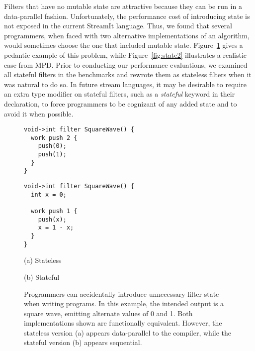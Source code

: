   Filters that have no mutable state are
  attractive because they can be run in a data-parallel fashion.
  Unfortunately, the performance cost of introducing state is not
  exposed in the current StreamIt language.  Thus, we found that
  several programmers, when faced with two alternative implementations
  of an algorithm, would sometimes choose the one that included
  mutable state.  Figure~\ref{fig:state} gives a pedantic example of
  this problem, while Figure~\ref{fig:state2} illustrates a realistic
  case from MPD.  Prior to conducting our performance evaluations, we
  examined all stateful filters in the benchmarks and rewrote them as
  stateless filters when it was natural to do so.  In future stream
  languages, it may be desirable to require an extra type modifier on
  stateful filters, such as a {\it stateful} keyword in their
  declaration, to force programmers to be cognizant of any added state
  and to avoid it when possible.

\begin{figure}[t]
\hspace{0.1\textwidth}
\begin{minipage}{0.35\textwidth}
\centering
\ninepoint
\begin{verbatim}
void->int filter SquareWave() {
  work push 2 {
    push(0);
    push(1);
  }
}
\end{verbatim}
\end{minipage}
\hspace{0.1\textwidth}
\begin{minipage}{0.35\textwidth}
\centering
\ninepoint
\begin{verbatim}
void->int filter SquareWave() {
  int x = 0;
 
  work push 1 {
    push(x);
    x = 1 - x;
  }
}
\end{verbatim}
\end{minipage}

\begin{minipage}{0.5\textwidth}
\centering
(a) Stateless
\end{minipage}
\begin{minipage}{0.5\textwidth}
\centering
(b) Stateful
\end{minipage}
\caption[Accidental introduction of filter state (pedantic example)]{Programmers 
  can accidentally introduce unnecessary filter state when writing
  programs.  In this example, the intended output is a square wave,
  emitting alternate values of 0 and 1.  Both implementations shown
  are functionally equivalent.  However, the stateless version (a)
  appears data-parallel to the compiler, while the stateful version
  (b) appears sequential.\protect\label{fig:state}}
\end{figure}

